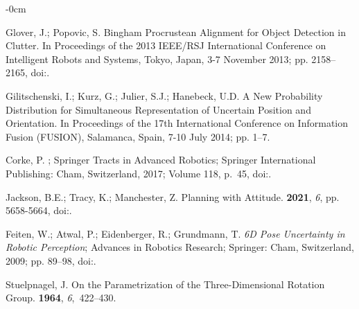 \documentclass[micromachines,article,accept,pdftex,moreauthors]{Definitions/mdpi}
\begin{document}
\begin{adjustwidth}{-\extralength}{0cm}
\begin{thebibliography}{999}
Glover, J.; Popovic, S.
\newblock Bingham Procrustean Alignment for Object Detection in Clutter.
\newblock In Proceedings of the  2013 IEEE/RSJ International Conference on Intelligent Robots and {Systems, Tokyo, Japan, 3-7 November 2013;} pp. 2158--2165,
\newblock
doi:{\href{https://doi.org/10.1109/IROS.2013.6696658}{}}.

Gilitschenski, I.; Kurz, G.; Julier, S.J.; Hanebeck, U.D.
\newblock A New Probability Distribution for Simultaneous Representation of Uncertain Position and Orientation.
\newblock In Proceedings of the 17th International Conference on Information Fusion {(FUSION), Salamanca, Spain, 7-10 July 2014;} pp. 1--7.

 Corke, P.
; Springer {{Tracts}} in {{Advanced Robotics}}; {Springer International Publishing}: Cham, Switzerland,  2017; Volume 118, p.~45,
\newblock
doi:{\href{https://doi.org/10.1007/978-3-319-54413-7}{}}.

 Jackson, B.E.; Tracy, K.; Manchester, Z.
\newblock Planning with Attitude.
 {\bf 2021}, {\em 6}, {pp. 5658-5664},
\newblock
doi:{\href{https://doi.org/10.1109/LRA.2021.3052431}{}}.

Feiten, W.; Atwal, P.; Eidenberger, R.; Grundmann, T.
\newblock \emph{{6D Pose Uncertainty} in {Robotic Perception}};
\newblock  Advances in Robotics Research; Springer: Cham, Switzerland, 2009; pp. 89--98,
\newblock
doi:{\href{https://doi.org/10.1007/978-3-642-01213-6_9}{}}.

Stuelpnagel, J.
\newblock On the {{Parametrization}} of the {{Three-Dimensional Rotation Group}}.
 {\bf 1964}, {\em 6},~422--430.


\end{thebibliography}
\end{adjustwidth}
\end{document}
